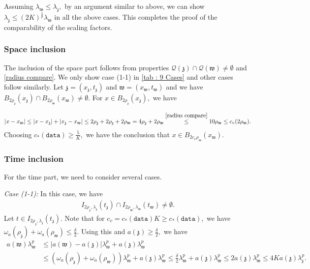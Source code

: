 \documentclass[11pt,oneside, english,reqno,twoside a4paper]{amsart}
\theoremstyle{definition}
\numberwithin{theorem}{section}
\numberwithin{equation}{section}
\newcommand{\mfz}{\mathfrak{z}}
\newcommand{\mfw}{\mathfrak{w}}
\begin{document}
Assuming $\lambda_{\mathfrak{w}}\leq \lambda_{\mathfrak{z}},$ by an argument similar to above, we can show $\lambda_{\mathfrak{z}}\leq (2K)^{\frac{1}{p}}\lambda_{\mathfrak{w}}$ in all the above cases. This completes the proof of the comparability of the scaling factors.

\subsubsection{Space inclusion} The inclusion of the space part follows from properties $\mathcal{Q}(\mathfrak{z})\cap \mathcal{Q}(\mathfrak{w})\neq \emptyset$ and \eqref{radius compare}. We only show case (1-1) in \cref{tab : 9 Cases} and other cases follow similarly. Let $\mathfrak{z}=(x_{\mathfrak{z}}, t_{\mathfrak{z}})$ and $\mathfrak{w}=(x_{\mathfrak{w}}, t_{\mathfrak{w}})$ and we have $B_{2\rho_{\mathfrak{z}}}(x_{\mathfrak{z}})\cap B_{2\rho_{\mathfrak{w}}}(x_{\mathfrak{w}})\neq \emptyset.$ For $x \in B_{2\rho_{\mathfrak{z}}}(x_{\mathfrak{z}}),$ we have

\begin{align*}
    |x-x_{\mathfrak{w}}|\leq |x-x_{\mathfrak{z}}|+|x_{\mathfrak{z}}-x_{\mathfrak{w}}|\leq 2\rho_{\mathfrak{z}}+2\rho_{\mathfrak{z}}+2\rho_{\mathfrak{w}}=4\rho_{\mathfrak z}+2\rho_{\mathfrak w}\overset{\eqref{radius compare}}{\leq} 10\rho_{\mathfrak{w}}\leq c_v (2\rho_{\mathfrak{w}}). 
\end{align*}
Choosing $c_*(\texttt{data})\geq \frac{5}{K},$ we have the conclusion that $x\in B_{2c_{v}\rho_{\mathfrak{w}}}(x_{\mathfrak w}).$
\subsubsection{Time inclusion} For the time part, we need to consider several cases.

\noindent \textit{Case (1-1):} In this case, we have
\begin{align*}
    I_{2\rho_{\mathfrak{z}}, \lambda_{\mathfrak{z}}}(t_{\mathfrak{z}})\cap I_{2\rho_{\mathfrak{w}}, \lambda_{\mathfrak{w}}}(t_{\mathfrak{w}})\neq \emptyset.
\end{align*}
Let $t \in I_{2\rho_{\mathfrak{z}}, \lambda_{\mathfrak{z}}}(t_{\mathfrak{z}}).$ Note that for $c_v= c_*(\texttt{data})K \geq c_*(\texttt{data}),$ we have $\omega_a(\rho_{\mfz})+\omega_a(\rho_{\mfw})\leq \frac{\delta}{2}.$ Using this and $a(\mathfrak{z})\geq \frac{\delta}{2},$ we have
\begin{align}\label{EQQ4.23}
a(\mfw)\lambda^p_{\mfw}&\leq |a(\mfw)-a(\mfz)|\lambda^p_{\mfw}+a(\mfz)\lambda^p_{\mfw}\nonumber\\
&\leq \left(\omega_a(\rho_{\mfz})+\omega_a(\rho_{\mfw})\right)\lambda^p_{\mfw}+a(\mfz)\lambda^p_{\mfw}\leq \frac{\delta}{2}\lambda^p_{\mfw}+a(\mfz)\lambda^p_{\mfw}\leq 2 a(\mfz)\lambda^p_{\mfw}\leq 4K a(\mfz)\lambda^p_{\mfz}.
\end{align}
\end{document}

